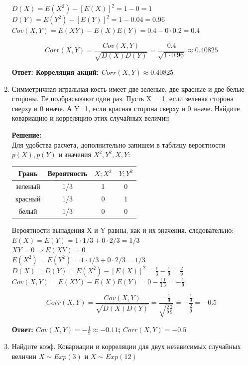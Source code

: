 \documentclass[a4paper,12pt]{article}
\begin{document}
\begin{enumerate}
$D(X) = E(X^2)- [E(X)]^2=1-0 = 1$\\
$D(Y) = E(Y^2)- [E(Y)]^2=1-0.04 = 0.96$\\
$Cov(X,Y)=E(XY)-E(X)E(Y)=0.4-0\cdot0.2=0.4$

$$Corr(X,Y) = \frac{Cov(X,Y)}{\sqrt{D(X)D(Y)}}=\frac{0.4}{\sqrt{1\cdot0.96}}\approx 0.40825$$

\textbf{Ответ: Корреляция акций: $Corr(X,Y)\approx 0.40825$} 



\item	Симметричная игральная кость имеет две зеленые, две красные и две белые стороны. Ее подбрасывают один раз. Пусть X = 1, если зеленая сторона сверху и 0 иначе. А Y=1, если красная сторона сверху и 0 иначе. Найдите ковариацию и корреляцию этих случайных величин

\textbf{Решение:}\\
Для удобства расчета, дополнительно запишем в таблицу вероятности $p(X), p(Y)$ и значения $X^2, Y^2, X, Y$:

\begin{center}
 \begin{tabular}{|c|c|c| c| } 
 \hline
 Грань & Вероятность& $X; X^2$& $Y; Y^2$ \\ [0.5ex] 
 \hline
 зеленый & 1/3 & 1&0 \\ 
 \hline
 красный & 1/3	 & 0&1  \\ 
 \hline
 белый& 1/3	 & 0&0  \\ 
 \hline
\end{tabular}
\end{center}

Вероятности выпадения X и Y равны, как и их значения, следовательно:
$E(X)=E(Y)=1\cdot1/3+0\cdot2/3=1/3$\\
$XY=0 \Rightarrow E(XY)=0$\\
$E(X^2)=E(Y^2)=1\cdot1/3+0\cdot2/3=1/3$\\
$D(X)=D(Y)=E(X^2)-[E(X)]^2=\frac{1}{3}-\frac{1}{9}=\frac{2}{9}$\\
$Cov(X,Y)=E(XY)-E(X)E(Y)=0-\frac{1}{3}\frac{1}{3}=-\frac{1}{9}$

$$Corr(X,Y) = \frac{Cov(X,Y)}{\sqrt{D(X)D(Y)}}=\frac{-\frac{1}{9}}{\sqrt{\frac{2}{9}\frac{2}{9}}}=-\frac{\frac{1}{9}}{\frac{2}{9}}=-0.5$$

\textbf{Ответ: $Cov(X,Y)=-\frac{1}{9}\approx-0.11$; $Corr(X,Y)=-0.5$} 

\item	Найдите коэф. Ковариации и корреляции для двух независимых случайных величин $X \sim Exp(3)$ и $X \sim Exp(12)$


\end{enumerate}
\end{document}
